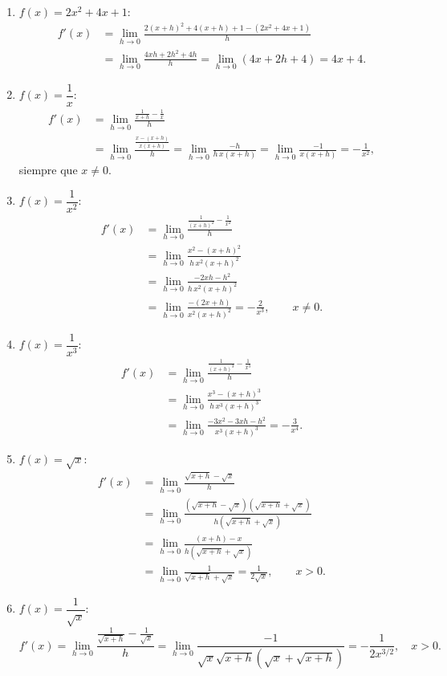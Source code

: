 \documentclass[12pt, letterpaper]{article}
\makeatletter
\renewcommand{\alph}[1]{\expandafter\@alphlatin\csname c@#1\endcsname}
\newcommand{\@alphlatin}[1]{\ifcase#1\or a\or b\or c\or d\or e\or f\or g\or h\or i\or j\or k\or l\or m\or n\or o\or p\or q\or r\or s\or t\or u\or v\or w\or x\or y\or z\else\@ctrerr\fi}
\makeatother
\begin{document}
\begin{enumerate}[label=\alph*)]
\[\begin{aligned}
  \end{aligned}
  \]
  \item $f(x)=2x^2+4x+1$:
  \[
  \begin{aligned}
  f'(x)&=\lim_{h\to0}\frac{2(x+h)^2+4(x+h)+1-(2x^2+4x+1)}h\\
  &=\lim_{h\to0}\frac{4xh+2h^2+4h}{h}
  =\lim_{h\to0}(4x+2h+4)=\boxed{4x+4}.
  \end{aligned}
  \]
  \item $f(x)=\dfrac1x$:
  \[
  \begin{aligned}
  f'(x)&=\lim_{h\to0}\frac{\frac1{x+h}-\frac1x}{h}\\
  &=\lim_{h\to0}\frac{\frac{x-(x+h)}{x(x+h)}}h
  =\lim_{h\to0}\frac{-h}{h\,x(x+h)}
  =\lim_{h\to0}\frac{-1}{x(x+h)}
  =\boxed{-\frac1{x^2}},
  \end{aligned}
  \]
  siempre que $x\neq0$.
  \item $f(x)=\dfrac1{x^2}$:
  \[
  \begin{aligned}
  f'(x)&=\lim_{h\to0}\frac{\frac1{(x+h)^2}-\frac1{x^2}}h\\
  &=\lim_{h\to0}\frac{x^2-(x+h)^2}{h\,x^2(x+h)^2}\\
  &=\lim_{h\to0}\frac{-2xh-h^2}{h\,x^2(x+h)^2}\\
  &=\lim_{h\to0}\frac{-(2x+h)}{x^2(x+h)^2}
  =\boxed{-\frac2{x^3}},\qquad x\neq0.
  \end{aligned}
  \]
  \item $f(x)=\dfrac1{x^3}$:
  \[
  \begin{aligned}
  f'(x)&=\lim_{h\to0}
  \frac{\frac1{(x+h)^3}-\frac1{x^3}}h\\
  &=\lim_{h\to0}\frac{x^3-(x+h)^3}{h\,x^3(x+h)^3}\\
  &=\lim_{h\to0}\frac{-3x^2-3xh-h^2}{x^3(x+h)^3}
  =\boxed{-\frac3{x^4}}.
  \end{aligned}
  \]
  \item $f(x)=\sqrt{x}$:
  \[
  \begin{aligned}
  f'(x)&=\lim_{h\to0}\frac{\sqrt{x+h}-\sqrt{x}}h\\
  &=\lim_{h\to0}
  \frac{(\sqrt{x+h}-\sqrt{x})(\sqrt{x+h}+\sqrt{x})}
  {h(\sqrt{x+h}+\sqrt{x})}\\
  &=\lim_{h\to0}\frac{(x+h)-x}{h(\sqrt{x+h}+\sqrt{x})}\\
  &=\lim_{h\to0}\frac1{\sqrt{x+h}+\sqrt{x}}
  =\boxed{\frac1{2\sqrt{x}}},\qquad x>0.
  \end{aligned}
  \]
  \item $f(x)=\dfrac1{\sqrt{x}}$:
  \[
  f'(x)=\lim_{h\to0}\frac{\frac1{\sqrt{x+h}}-\frac1{\sqrt{x}}}{h}
  =\lim_{h\to0}\frac{-1}{\sqrt{x}\sqrt{x+h}(\sqrt{x}+\sqrt{x+h})}
  =\boxed{-\frac{1}{2x^{3/2}}},\quad x>0.
  \]
\end{enumerate}
\end{document}
